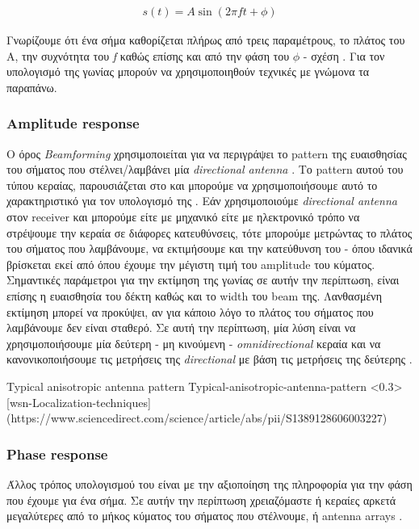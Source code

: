 \begin{align}
	s(t)=A\sin(2\pi ft + \phi) \label{eq:signal-equation}
\end{align}

Γνωρίζουμε ότι ένα σήμα καθορίζεται πλήρως από τρεις παραμέτρους, το πλάτος του A, την συχνότητα του \emph{f} καθώς 
επίσης και από την φάση του $\phi$ - σχέση . Για τον υπολογισμό της γωνίας  μπορούν 
να χρησιμοποιηθούν τεχνικές με γνώμονα τα παραπάνω. 

\subsubsection{Amplitude response}
Ο όρος \emph{Beamforming} \cite{wikipedia-beamforming} χρησιμοποιείται για να περιγράψει το pattern 
της ευαισθησίας του σήματος που στέλνει/λαμβάνει μία \emph{directional antenna} \cite{wikipedia-directionl-antenna}. 
Το pattern αυτού του τύπου κε\-ραί\-ας, παρουσιάζεται στο 
\cite{wsn-Localization-techniques} και μπορούμε να χρησιμοποιήσουμε αυτό το χαρακτηριστικό για τον υπολογισμό της . 
Εάν χρησιμοποιούμε \emph{directional ante\-nna} στον receiver και μπορούμε είτε με μηχανικό είτε με ηλεκτρονικό τρόπο να στρέψουμε
την κεραία σε διάφορες κατευθύνσεις, τότε μπορούμε μετρώντας το πλάτος του σήματος που λαμβάνουμε, να εκτιμήσουμε και την κατεύθυνση του - όπου ιδανικά
βρίσκεται εκεί από όπου έχουμε την μέγιστη τιμή του amplitude του κύματος. Σημαντικές παράμετροι για την εκτίμηση της γωνίας σε αυτήν την περίπτωση, 
είναι επίσης η ευαισθησία του δέκτη καθώς και το width του beam της. 
Λανθασμένη εκτίμηση μπορεί να προκύψει, αν για κάποιο λόγο το πλάτος του σήματος που λαμβάνουμε δεν είναι σταθερό. Σε αυτή την περίπτωση, μία λύση
είναι να χρησιμοποιήσουμε μία δεύτερη - μη κινούμενη - \emph{omnidirectional} κεραία και να κανονικοποιήσουμε τις μετρήσεις της \emph{directional} με βάση τις   
μετρήσεις της δεύτερης \cite{wsn-Localization-techniques}.

{Typical anisotropic antenna pattern}%
{Typical-anisotropic-antenna-pattern}%
<0.3>%
[wsn-Localization-techniques]%
(https://www.sciencedirect.com/science/article/abs/pii/S1389128606003227) %

\subsubsection{Phase response}
Άλλος τρόπος υπολογισμού του  είναι με την αξιοποίηση της πληροφορία για την φάση που έχουμε για ένα σήμα. Σε αυτήν την περίπτωση
χρειαζόμαστε ή κεραίες αρκετά μεγαλύτερες από το μήκος κύματος του σήματος που στέλνουμε, ή antenna arrays \cite{wsn-Localization-techniques}. 

